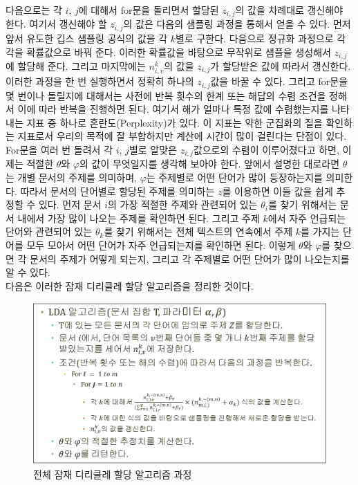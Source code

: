 \documentclass[a4paper]{oblivoir}
\begin{document}
다음으로는 각 $i$, $j$에 대해서 for문을 돌리면서 할당된 $z_{i,j}$의 값을 차례대로 갱신해야 한다. 여기서 갱신해야 할 $z_{i,j}$의 값은 다음의 샘플링 과정을 통해서 얻을 수 있다. 먼저 앞서 유도한 깁스 샘플링 공식의 값을 각 $k$별로 구한다. 다음으로 정규화 과정으로 각각을 확률값으로 바꿔 준다. 이러한 확률값을 바탕으로 무작위로 샘플을 생성해서 $z_{i,j}$에 할당해 준다. 그리고 마지막에는 $n^{k}_{i,v}$의 값을 $z_{i,j}$가 할당받은 값에 따라서 갱신한다. 이러한 과정을 한 번 실행하면서 정확히 하나의 $z_{i,j}$값을 바꿀 수 있다. 그리고 for문을 몇 번이나 돌릴지에 대해서는 사전에 반복 횟수의 한계 또는 해답의 수렴 조건을 정해서 이에 따라 반복을 진행하면 된다. 여기서 해가 얼마나 특정 값에 수렴했는지를 나타내는 지표 중 하나로 혼란도(Perplexity)가 있다. 이 지표는 약한 군집화의 질을 확인하는 지표로서 우리의 목적에 잘 부합하지만 계산에 시간이 많이 걸린다는 단점이 있다. \\      

For문을 여러 번 돌려서 각 $i$, $j$별로 알맞은 $z_{i,j}$값으로의 수렴이 이루어졌다고 하면, 이제는 적절한 $\theta$와 $\varphi$의 값이 무엇일지를 생각해 보아야 한다. 앞에서 설명한 대로라면 $\theta$는 개별 문서의 주제를 의미하며, $\varphi$는 주제별로 어떤 단어가 많이 등장하는지를 의미한다. 따라서 문서의 단어별로 할당된 주제를 의미하는 $z$를 이용하면 이들 값을 쉽게 추정할 수 있다. 먼저 문서 $i$의 가장 적절한 주제와 관련되어 있는 $\theta_i$를 찾기 위해서는 문서 내에서 가장 많이 나오는 주제를 확인하면 된다. 그리고 주제 $k$에서 자주 언급되는 단어와 관련되어 있는 $\theta_k$를 찾기 위해서는 전체 텍스트의 연속에서 주제 $k$를 가지는 단어를 모두 모아서 어떤 단어가 자주 언급되는지를 확인하면 된다. 이렇게 $\theta$와 $\varphi$를 찾으면 각 문서의 주제가 어떻게 되는지, 그리고 각 주제별로 어떤 단어가 많이 나오는지를 알 수 있다. \\

다음은 이러한 잠재 디리클레 할당 알고리즘을 정리한 것이다.
            
\begin{figure}[ht] \centering 
\includegraphics[scale=0.5]{fig10_26.png} 
\caption{전체 잠재 디리클레 할당 알고리즘 과정}
\label{fig:10-24}
\end{figure}
      
\end{document}
